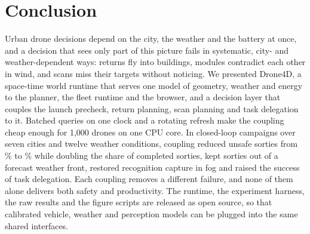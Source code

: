 \section{Conclusion}\label{sec:conclusion}

Urban drone decisions depend on the city, the weather and the battery at once, and a decision that sees only part of
this picture fails in systematic, city- and weather-dependent ways: returns fly into buildings, modules contradict each
other in wind, and scans miss their targets without noticing. We presented Drone4D, a space-time world runtime that serves one model of
geometry, weather and energy to the planner, the fleet runtime and the browser, and a decision layer that couples the
launch precheck, return planning, scan planning and task delegation to it. Batched queries on one clock and a rotating
refresh make the coupling cheap enough for 1,000 drones on one CPU core. In closed-loop campaigns over seven cities and
twelve weather conditions, coupling reduced unsafe sorties from \PXUNSAFE\% to \CPUNSAFE\% while doubling the share of
completed sorties, kept sorties out of a forecast weather front, restored recognition capture in fog and raised the
success of task delegation. Each coupling removes a different failure, and none of them alone delivers both safety and
productivity. 
The runtime, the experiment harness, the raw results and the figure scripts are released as open source,
so that calibrated vehicle, weather and perception models can be plugged into the same shared interfaces.
